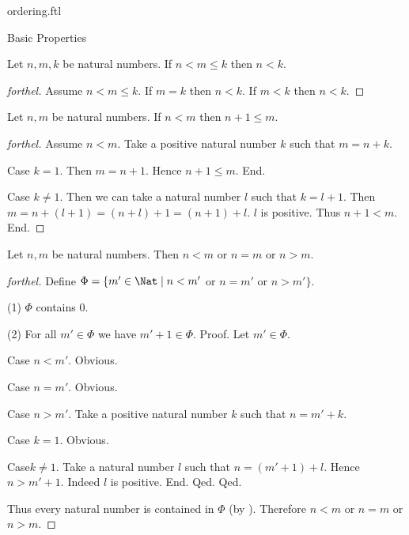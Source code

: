 \documentclass{naproche-library}
\begin{document}
\begin{smodule}[title=The Standard Ordering of the Natural Numbers]{ordering.ftl}
\begin{sfragment}{Basic Properties}
  \begin{proposition}[forthel,id=ARITHMETIC_04_4809599527944192]
    Let $n, m, k$ be natural numbers.
    If $n < m \leq k$ then $n < k$.
  \end{proposition}
  \begin{proof}[forthel]
    Assume $n < m \leq k$.
    If $m = k$ then $n < k$.
    If $m < k$ then $n < k$.
  \end{proof}

  \begin{proposition}[forthel,id=ARITHMETIC_04_8584998051381248]
    Let $n, m$ be natural numbers.
    If $n < m$ then $n + 1 \leq m$.
  \end{proposition}
  \begin{proof}[forthel]
    Assume $n < m$.
    Take a positive natural number $k$ such that $m = n + k$.

    Case $k = 1$.
      Then $m = n + 1$.
      Hence $n + 1 \leq m$.
    End.

    Case $k \neq 1$.
      Then we can take a natural number $l$ such that $k = l + 1$.
      Then $m
        = n + (l + 1)
        = (n + l) + 1
        = (n + 1) + l$.
      $l$ is positive.
      Thus $n + 1 < m$.
    End.
  \end{proof}

  \begin{proposition}[forthel,id=ARITHMETIC_04_8201937860165632]
    Let $n, m$ be natural numbers.
    Then $n < m$ or $n = m$ or $n > m$.
  \end{proposition}
  \begin{proof}[forthel]
    Define $\Phi = \{ m' \in \Nat \mid n < m'$ or $n = m'$ or $n > m' \}$.

    (1) $\Phi$ contains $0$.

    (2) For all $m' \in \Phi$ we have $m' + 1 \in \Phi$. \newline
    Proof.
      Let $m' \in \Phi$.

      Case $n < m'$. Obvious.

      Case $n = m'$. Obvious.

      Case $n > m'$.
        Take a positive natural number $k$ such that $n = m' + k$.

        Case $k = 1$. Obvious.

        Case$k \neq 1$.
          Take a natural number $l$ such that $n = (m' + 1) + l$.
          Hence $n > m' + 1$.
          Indeed $l$ is positive.
        End.
      Qed.
    Qed.

    Thus every natural number is contained in $\Phi$ (by ).
    Therefore $n < m$ or $n = m$ or $n > m$.
  \end{proof}


\end{sfragment}
\end{smodule}
\end{document}
